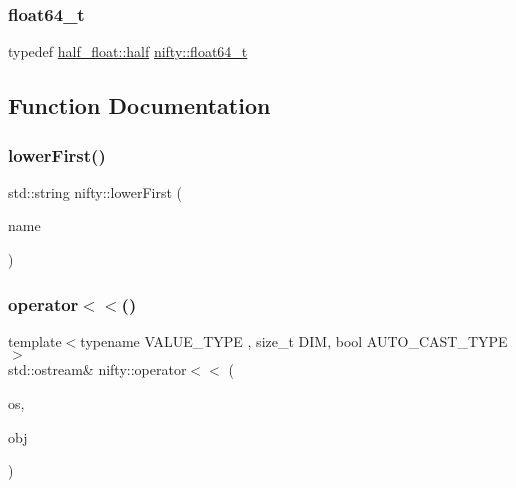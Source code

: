 \subsubsection{\texorpdfstring{float64\+\_\+t}{float64\_t}}
{\footnotesize\ttfamily typedef \hyperlink{classhalf__float_1_1half}{half\+\_\+float\+::half} \hyperlink{namespacenifty_a86e0138624471d998bfa1c2836c9ad7e}{nifty\+::float64\+\_\+t}}



\subsection{Function Documentation}
\mbox{\label{namespacenifty_af89b6a59b4fc8d4224d6a73f745d52f9}} 
\subsubsection{\texorpdfstring{lower\+First()}{lowerFirst()}}
{\footnotesize\ttfamily std\+::string nifty\+::lower\+First (\begin{DoxyParamCaption}\item[{const std\+::string \&}]{name }\end{DoxyParamCaption})\hspace{0.3cm}{\ttfamily [inline]}}

\mbox{\label{namespacenifty_a0b15288d0f31e0356269a1af3a12de5f}} 
\subsubsection{\texorpdfstring{operator$<$$<$()}{operator<<()}}
{\footnotesize\ttfamily template$<$typename V\+A\+L\+U\+E\+\_\+\+T\+Y\+PE , size\+\_\+t D\+IM, bool A\+U\+T\+O\+\_\+\+C\+A\+S\+T\+\_\+\+T\+Y\+PE$>$ \\
std\+::ostream\& nifty\+::operator$<$$<$ (\begin{DoxyParamCaption}\item[{std\+::ostream \&}]{os,  }\item[{const \hyperlink{classnifty_1_1marray_1_1PyView}{nifty\+::marray\+::\+Py\+View}$<$ V\+A\+L\+U\+E\+\_\+\+T\+Y\+PE, D\+IM, A\+U\+T\+O\+\_\+\+C\+A\+S\+T\+\_\+\+T\+Y\+PE $>$ \&}]{obj }\end{DoxyParamCaption})}

